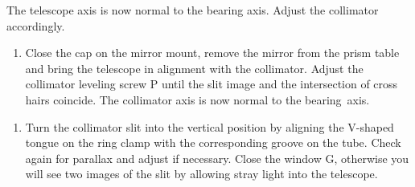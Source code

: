 \documentclass[12pt]{article}
\begin{document}
The telescope axis is now normal to the bearing axis. Adjust the collimator  accordingly.
\begin{enumerate}[resume]
    \item Close the cap on the mirror mount, remove the mirror from the prism table and bring the telescope in alignment with the collimator. Adjust the collimator leveling screw P until the slit image and the intersection of cross hairs coincide.  The collimator axis is now normal to the bearing~axis.
\end{enumerate}

 \begin{enumerate}[resume]
    \item Turn the collimator slit into the vertical position by aligning the V-shaped tongue on the ring clamp with the corresponding  groove on the tube. Check again for parallax and adjust if necessary. Close the window G, otherwise you will see two images of the slit by allowing stray light into the telescope.
\end{enumerate}
\end{document}
